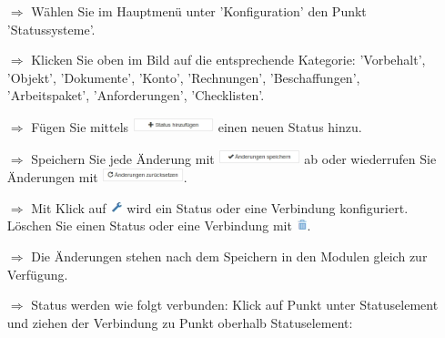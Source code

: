 \documentclass{article}
\begin{document}
\begin{multicols}{2}

\begin{tcolorbox}[colback=blue!5,colframe=blue!40!black,title=Workflows erstellen]
\begin{itemize}
  \item[$\Longrightarrow$] Wählen Sie im Hauptmenü unter 'Konfiguration' den Punkt 'Statussysteme'.
  \item[$\Longrightarrow$] Klicken Sie oben im Bild auf die entsprechende Kategorie: 'Vorbehalt', 'Objekt', 'Dokumente', 'Konto', 'Rechnungen', 'Beschaffungen', 'Arbeitspaket', 'Anforderungen', 'Checklisten'.
  \item[$\Longrightarrow$] Fügen Sie mittels \includegraphics[height=12pt]{Icons/StatusHinzufuegen.jpg} einen neuen Status hinzu.
  \item[$\Longrightarrow$] Speichern Sie jede Änderung mit \includegraphics[height=12pt]{Icons/AenderungenSpeichern.jpg} ab oder wiederrufen Sie Änderungen mit \includegraphics[height=12pt]{Icons/AenderungenZuruecksetzen.jpg}.
	\item[$\Longrightarrow$] Mit Klick auf \includegraphics[height=10pt]{Icons/Schraubenschluessel.jpg} wird ein Status oder eine Verbindung konfiguriert. Löschen Sie einen Status oder eine Verbindung mit \includegraphics[height=10pt]{Icons/Muelltonne.jpg}.
	\item[$\Longrightarrow$] Die Änderungen stehen nach dem Speichern in den Modulen gleich zur Verfügung.
\end{itemize}
\end{tcolorbox}


\begin{tcolorbox}[colback=blue!5,colframe=blue!40!black,title=Workflows konfigurieren 1]
\begin{itemize}
  \item[$\Longrightarrow$] Status werden wie folgt verbunden: Klick auf Punkt unter Statuselement und ziehen der Verbindung zu Punkt oberhalb Statuselement:


\end{itemize}
\end{tcolorbox}
\end{multicols}
\end{document}
